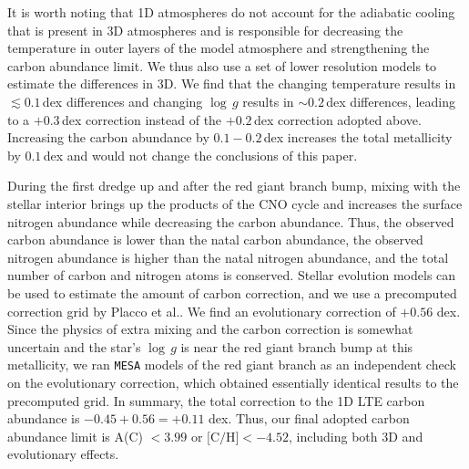 \documentclass{natureprintstyle}
\newcommand{\code}[1]{\texttt{#1}\xspace}
\newcommand{\logg}{\ensuremath{\log\,g}\xspace}
\begin{document}
It is worth noting that 1D atmospheres do not account for the adiabatic cooling that is present in 3D atmospheres and is responsible for decreasing the temperature in outer layers of the model atmosphere\cite{Asplund1999} and strengthening the carbon abundance limit\cite{Eitner2024,Caffau2024}. We thus also use a set of lower resolution models to estimate the differences in 3D.
We find that the changing temperature results in ${\lesssim}0.1\,$dex differences and changing $\logg$ results in ${\sim}0.2\,$dex differences, leading to a $+0.3\,$dex correction instead of the $+0.2\,$dex correction adopted above. Increasing the carbon abundance by $0.1-0.2\,$dex increases the total metallicity by $0.1\,$dex and would not change the conclusions of this paper.

During the first dredge up and after the red giant branch bump, mixing with the stellar interior brings up the products of the CNO cycle and increases the surface nitrogen abundance while decreasing the carbon abundance\cite{Gratton2000}.
Thus, the observed carbon abundance is lower than the natal carbon abundance, the observed nitrogen abundance is higher than the natal nitrogen abundance, and the total number of carbon and nitrogen atoms is conserved.
Stellar evolution models can be used to estimate the amount of carbon correction, and we use a precomputed correction grid by Placco et al.\cite{Placco2014}.
We find an evolutionary correction of $+0.56$ dex.
Since the physics of extra mixing and the carbon correction is somewhat uncertain and the star's \logg is near the red giant branch bump at this metallicity\cite{Fraser2022,Tayar2022}, we ran \code{MESA} models of the red giant branch as an independent check on the evolutionary correction, which obtained essentially identical results to the precomputed grid.
In summary, the total correction to the 1D LTE carbon abundance is $-0.45+0.56 = +0.11$ dex.
Thus, our final adopted carbon abundance limit is A(C) $< 3.99$ or $\mbox{[C/H]} < -4.52$, including both 3D and evolutionary effects.
\end{document}
